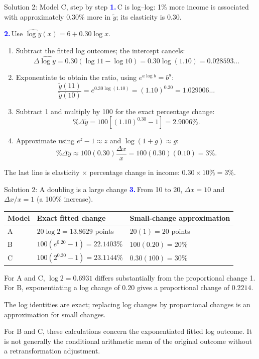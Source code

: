 \documentclass[notes,10pt, aspectratio=169]{beamer}
\newcommand{\answerpart}[1]{\textcolor{blue}{\textbf{#1.}}\,}
\begin{document}
\begin{frame}{Solution 2: Model C, step by step}
\small
\setlength{\abovedisplayskip}{4pt}
\setlength{\belowdisplayskip}{4pt}
\answerpart{1}C is log--log: 1\% more income is associated with approximately $0.30$\% more in $\tilde y$; its elasticity is $0.30$.
\par\smallskip
\answerpart{2}Use $\widehat{\log y}(x)=6+0.30\log x$.
\begin{enumerate}
\item Subtract the fitted log outcomes; the intercept cancels:
\[
\Delta\widehat{\log y}=0.30(\log11-\log10)=0.30\log(1.10)=0.028593\ldots
\]
\item Exponentiate to obtain the ratio, using $e^{a\log b}=b^a$:
\[
\frac{\tilde y(11)}{\tilde y(10)}=e^{0.30\log(1.10)}=(1.10)^{0.30}=1.029006\ldots
\]
\item Subtract 1 and multiply by 100 for the exact percentage change:
\[
\%\Delta\tilde y=100[(1.10)^{0.30}-1]=\boxed{2.9006\%}.
\]
\item Approximate using $e^z-1\approx z$ and $\log(1+g)\approx g$:
\[
\%\Delta\tilde y\approx100(0.30)\frac{\Delta x}{x}
=100(0.30)(0.10)=\boxed{3\%}.
\]
\end{enumerate}
The last line is elasticity $\times$ percentage change in income: $0.30\times10\%=3\%$.
\end{frame}

\begin{frame}{Solution 2: A doubling is a large change}
\small
\answerpart{3}From 10 to 20, $\Delta x=10$ and $\Delta x/x=1$ (a 100\% increase).
\begin{center}
\begin{tabular}{lll}
\toprule
Model & Exact fitted change & Small-change approximation\\
\midrule
A & $20\log2=13.8629$ points & $20(1)=20$ points\\[4pt]
B & $100(e^{0.20}-1)=22.1403$\% & $100(0.20)=20$\%\\[4pt]
C & $100(2^{0.30}-1)=23.1144$\% & $0.30(100)=30$\%\\
\bottomrule
\end{tabular}
\end{center}
\par\smallskip
For A and C, $\log2=0.6931$ differs substantially from the proportional change 1. For B, exponentiating a log change of $0.20$ gives a proportional change of $0.2214$.
\par\medskip
The log identities are exact; replacing log changes by proportional changes is an approximation for small changes.
\par\smallskip
For B and C, these calculations concern the exponentiated fitted log outcome. It is not generally the conditional arithmetic mean of the original outcome without a retransformation adjustment.
\end{frame}
\fi
\end{document}
